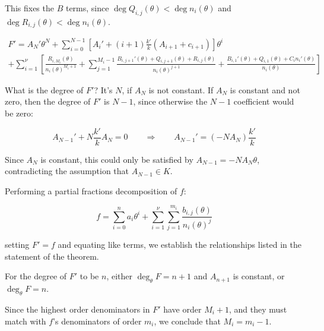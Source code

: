 This fixes the $B$ terms, since $\deg Q_{i,j}(\theta) < \deg n_i(\theta)$
and $\deg R_{i,j}(\theta) < \deg n_i(\theta)$.

\begin{comment}
\begin{multline*}
F' = A_N' \theta^N + \sum_{i=0}^{N-1} \left[ A_i' + (i+1) \frac{k'}{k} (A_{i+1} + c_{i+1} \right] \theta^{i} \\
+ \sum_{i=1}^\nu \left[ \sum_{j=1}^{M_i} \frac{B_{i,j+1}'(\theta) + Q_{i,j+1}(\theta) + R_{i,j}(\theta)}{n_i(\theta)^{j+1}}
  + \frac{B_{i,1}'(\theta) + Q_{i,1}(\theta) + C_i n_i'(\theta)}{n_i(\theta)} \right]
\end{multline*}
\end{comment}

\begin{multline*}
F' = A_N' \theta^N + \sum_{i=0}^{N-1} \left[ A_i' + (i+1) \frac{k'}{k} (A_{i+1} + c_{i+1})\right] \theta^{i} \\
+ \sum_{i=1}^\nu \left[ \frac{R_{i,M_i}(\theta)}{n_i(\theta)^{M_i+1}}
+ \sum_{j=1}^{M_i-1} \frac{B_{i,j+1}'(\theta) + Q_{i,j+1}(\theta) + R_{i,j}(\theta)}{n_i(\theta)^{j+1}}
  + \frac{B_{i,1}'(\theta) + Q_{i,1}(\theta) + C_i n_i'(\theta)}{n_i(\theta)} \right]
\end{multline*}

What is the degree of $F'$?  It's $N$, if $A_N$ is not constant.  If $A_N$ is constant and not zero, then
the degree of $F'$ is $N-1$, since otherwise the $N-1$ coefficient would be zero:

$$A_{N-1}' + N \frac{k'}{k} A_N = 0  \qquad\Longrightarrow\qquad A_{N-1}' = (- N A_N ) \frac{k'}{k}$$

Since $A_N$ is constant, this could only be satisfied by $A_{N-1} = - N A_N \theta$,
contradicting the assumption that $A_{N-1} \in K$.

Performing a partial fractions decomposition of $f$:

$$f = \sum_{i=0}^n a_i \theta^i
+ \sum_{i=1}^\nu \sum_{j=1}^{m_i} \frac{b_{i,j}(\theta)}{n_i(\theta)^j}$$

setting $F' = f$ and equating like terms, we establish the
relationships listed in the statement of the theorem.

For the degree of $F'$ to be $n$, either $\deg_\theta F = n+1$ and $A_{n+1}$ is
constant, or $\deg_\theta F = n$.

Since the highest order denominators in $F'$ have order $M_i + 1$, and
they must match with $f$'s denominators of order $m_i$, we conclude
that $M_i = m_i - 1$.

